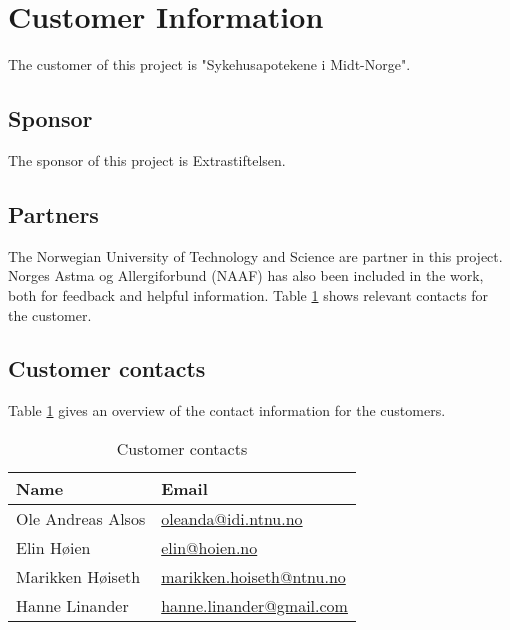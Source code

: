 \section{Customer Information}
\label{sec:custinf}
The customer of this project is "Sykehusapotekene i Midt-Norge". 

\subsection{Sponsor}
The sponsor of this project is Extrastiftelsen.

\subsection{Partners}
The Norwegian University of Technology and Science are partner in this project. Norges Astma og Allergiforbund (NAAF) has also been included in the work, both for feedback and helpful information. Table \ref{tab:customercontacts} shows relevant contacts for the customer. 

\subsection{Customer contacts}
Table \ref{tab:customercontacts} gives an overview of the contact information for the customers.
\begin{table}
	\begin{center}
		\begin{tabular}{|p{4cm}|p{7cm}|}   
			\hline      
			\bf{Name} & \bf{Email} \\ 
			\hline
			Ole Andreas Alsos & \href{mailto:oleanda@idi.ntnu.no}{oleanda@idi.ntnu.no}  \\     
			\hline
			Elin Høien & \href{mailto:elin@hoien.no}{elin@hoien.no}
			\\
			\hline
			Marikken Høiseth &
			\href{mailto:marikken.hoiseth@ntnu.no}{marikken.hoiseth@ntnu.no}\\
			\hline
			Hanne Linander &
			\href{mailto:hanne.linander@gmail.com}{hanne.linander@gmail.com}
			\\
			\hline
		 \end{tabular}
	\end{center}
	\caption{Customer contacts}
	\label{tab:customercontacts}
\end{table}
\clearpage{}
